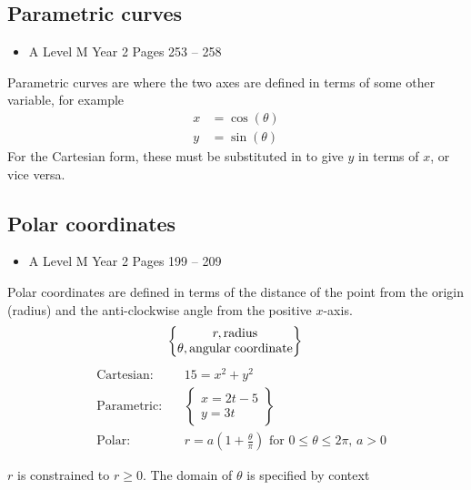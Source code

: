\documentclass[11pt, a4paper]{article}
\begin{document}
\subsection{Parametric curves}
\begin{itemize}
\item A Level M Year 2 \hspace{1cm} \phantom{ AS / } Pages 253 -- 258
\end{itemize} \par
Parametric curves are where the two axes are defined in terms of some other variable, for example
\vspace{-0.2cm}
\begin{align*}
x&=\cos(\theta) \\
y&=\sin(\theta)
\end{align*}
For the Cartesian form, these must be substituted in to give $y$ in terms of $x$, or vice versa.
\vspace{0.5cm}


\subsection{Polar coordinates}
\begin{itemize}
\item A Level M Year 2 \hspace{1cm} \phantom{ AS / } Pages 199 -- 209
\end{itemize}
Polar coordinates are defined in terms of the distance of the point from the origin (radius) and the anti-clockwise angle from the positive $x$-axis.
\begin{equation*}
\begin{Bmatrix} r, \mathrm{radius} \\ \theta, \mathrm{angular\; coordinate}\end{Bmatrix} \\
\end{equation*}
\begin{align*}
&\mathrm{Cartesian:} & &15=x^{2}+y^{2} \\
&\mathrm{Parametric:}&  &\begin{Bmatrix} x=2t-5 \\ y=3t \end{Bmatrix} \\
&\mathrm{Polar:}&  &r=a\left( 1+\frac{\theta}{\pi} \right)\text{ for } 0\leq\theta\leq2\pi\text{, }a>0
\end{align*}
\par
$r$ is constrained to $r\geq0$. The domain of $\theta$ is specified by context
\end{document}
